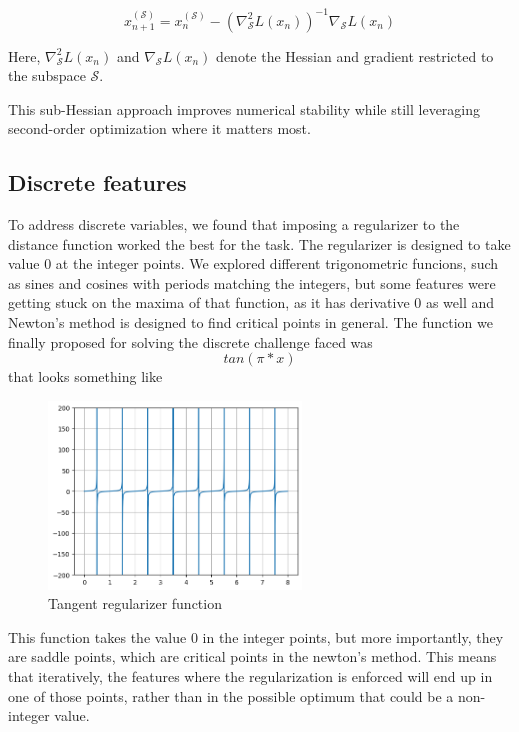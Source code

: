 \documentclass[12pt]{extarticle}
\numberwithin{equation}{section}
\begin{document}
\[
x_{n+1}^{(\mathcal{S})} = x_n^{(\mathcal{S})} - \left( \nabla^2_{\mathcal{S}} L(x_n) \right)^{-1} \nabla_{\mathcal{S}} L(x_n)
\]

Here, \( \nabla^2_{\mathcal{S}} L(x_n) \) and \( \nabla_{\mathcal{S}} L(x_n) \) denote the Hessian and gradient restricted to the subspace \( \mathcal{S} \).

This sub-Hessian approach improves numerical stability while still leveraging second-order optimization where it matters most.


\subsection{Discrete features}
To address discrete variables, we found that imposing a regularizer to the distance function worked the best for the task. The regularizer is designed 
to take value 0 at the integer points. We explored different trigonometric funcions, such as sines and cosines with periods matching the integers, but some features were getting stuck on the maxima of that function, as it has derivative 0 as well and Newton's method is designed to find critical points in general. The function we finally proposed for solving the discrete challenge faced was
\begin{equation}
    tan(\pi * x)
\end{equation}
that looks something like
\begin{figure}[H]
    \centering
    \includegraphics[width=0.6\textwidth]{images/integers}
    \caption{Tangent regularizer function}
    \label{fig:reg tan}
\end{figure}
\noindent
This function takes the value 0 in the integer points, but more importantly, they are saddle points, which are critical points in the newton's method. This means that iteratively, the features where the regularization is enforced will end up in one of those points, rather than in the possible optimum that could be a non-integer value.\\
\\
\end{document}
